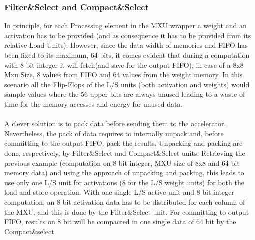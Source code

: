\subsubsection{Filter\&Select and Compact\&Select}
In principle, for each Processing element in the MXU wrapper a weight and an activation has to be provided (and as consequence it has to be provided from its relative Load Units). However, since the data width of memories and FIFO has been fixed to its maximum, 64 bits, it comes evident that during a computation with 8 bit integer it will fetch(and save for the output FIFO), in case of a 8x8 Mxu Size, 8 values from FIFO and 64 values from the weight memory. In this scenario all the Flip-Flops of the L/S units (both activation and weights) would sample values where the 56 upper bits are always unused leading to a waste of time for the memory accesses and energy for unused data.\\\\A clever solution is to pack data before sending them to the accelerator. Nevertheless, the pack of data requires to internally unpack and, before committing to the output FIFO, pack the results.
Unpacking and packing are done, respectively, by Filter\&Select and Compact\&Select units.
Retrieving the previous example (computation on 8 bit integer, MXU size of 8x8 and 64 bit memory data) and using the approach of unpacking and packing, this leads to use only one L/S unit for activations (8 for the L/S weight units) for both the load and store operation. With one single L/S active unit and 8 bit integer computation, an 8 bit activation data has to be distributed for each column of the MXU, and this is done by the Filter\&Select unit. For committing to output FIFO, results on 8 bit will be compacted in one single data of 64 bit by the Compact\&select.\\

